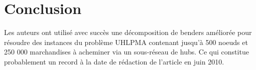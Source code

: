\section{Conclusion}

Les auteurs ont utilisé avec succès une décomposition de benders améliorée pour résoudre des instances du problème UHLPMA contenant jusqu'à 500 noeuds et 250 000 marchandises à acheminer via un sous-réseau de hubs. Ce qui constitue probablement un record à la date de rédaction de l'article en juin 2010.
